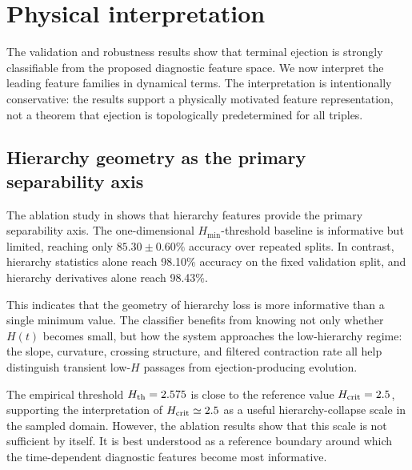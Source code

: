 \documentclass[12pt,a4paper]{article}
\newcommand{\Hcrit}{H_{\rm crit}}
\newcommand{\Hmin}{H_{\min}}
\begin{document}
\section{Physical interpretation}
\label{sec:physical_interpretation}

The validation and robustness results show that terminal ejection is strongly classifiable from the proposed diagnostic feature space. We now interpret the leading feature families in dynamical terms. The interpretation is intentionally conservative: the results support a physically motivated feature representation, not a theorem that ejection is topologically predetermined for all triples.

\subsection{Hierarchy geometry as the primary separability axis}
\label{sec:hierarchy_primary_axis}

The ablation study in  shows that hierarchy features provide the primary separability axis. The one-dimensional \(\Hmin\)-threshold baseline is informative but limited, reaching only \(85.30\pm0.60\%\) accuracy over repeated splits. In contrast, hierarchy statistics alone reach 98.10\% accuracy on the fixed validation split, and hierarchy derivatives alone reach 98.43\%.

This indicates that the geometry of hierarchy loss is more informative than a single minimum value. The classifier benefits from knowing not only whether \(H(t)\) becomes small, but how the system approaches the low-hierarchy regime: the slope, curvature, crossing structure, and filtered contraction rate all help distinguish transient low-\(H\) passages from ejection-producing evolution.

The empirical threshold \(H_{\rm th}=2.575\) is close to the reference value \(\Hcrit=2.5\), supporting the interpretation of \(\Hcrit\simeq2.5\) as a useful hierarchy-collapse scale in the sampled domain. However, the ablation results show that this scale is not sufficient by itself. It is best understood as a reference boundary around which the time-dependent diagnostic features become most informative.

\end{document}
